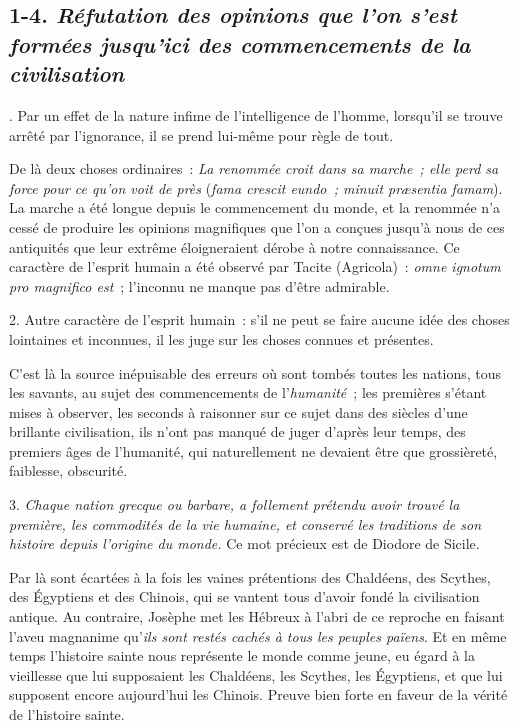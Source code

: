 \documentclass[french,twoside]{book} %
\begin{document}
\subsection[{1-4. Réfutation des opinions que l’on s’est formées jusqu’ici des commencements de la civilisation}]{ \textsc{1-4. } {\itshape Réfutation des opinions que l’on s’est formées jusqu’ici des commencements de la civilisation} }
. Par un effet de la nature infime de l’intelligence de l’homme, lorsqu’il se trouve arrêté par l’ignorance, il se prend lui-même pour règle de tout.\par
 De là deux choses ordinaires : {\itshape La renommée croit dans sa marche ; elle perd sa force pour ce qu’on voit de près} ({\itshape fama crescit eundo ; minuit præsentia famam}). La marche a été longue depuis le commencement du monde, et la renommée n’a cessé de produire les opinions magnifiques que l’on a conçues jusqu’à nous de ces antiquités que leur extrême éloigneraient dérobe à notre connaissance. Ce caractère de l’esprit humain a été observé par Tacite (Agricola) : \emph{{\itshape omne ignotum pro magnifico est}} ; l’inconnu ne manque pas d’être admirable.\par
\par
2. Autre caractère de l’esprit humain : s’il ne peut se faire aucune idée des choses lointaines et inconnues, il les juge sur les choses connues et présentes.\par
C’est là la source inépuisable des erreurs où sont tombés toutes les nations, tous les savants, au sujet des commencements de l’{\itshape humanité} ; les premières s’étant mises à observer, les seconds à raisonner sur ce sujet dans des siècles d’une brillante civilisation, ils n’ont pas manqué de juger d’après leur temps, des premiers âges de l’humanité, qui naturellement ne devaient être que grossièreté, faiblesse, obscurité.\par
3. \emph{{\itshape Chaque nation grecque ou barbare, a follement prétendu avoir trouvé la première, les commodités de la vie humaine, et conservé les traditions de son histoire depuis l’origine du monde.}} Ce mot précieux est de Diodore de Sicile.\par
 Par là sont écartées à la fois les vaines prétentions des Chaldéens, des Scythes, des Égyptiens et des Chinois, qui se vantent tous d’avoir fondé la civilisation antique. Au contraire, Josèphe met les Hébreux à l’abri de ce reproche en faisant l’aveu magnanime qu’\emph{{\itshape ils sont restés cachés à tous les peuples païens}}. Et en même temps l’histoire sainte nous représente le monde comme jeune, eu égard à la vieillesse que lui supposaient les Chaldéens, les Scythes, les Égyptiens, et que lui supposent encore aujourd’hui les Chinois. Preuve bien forte en faveur de la vérité de l’histoire sainte.\par
\end{document}
